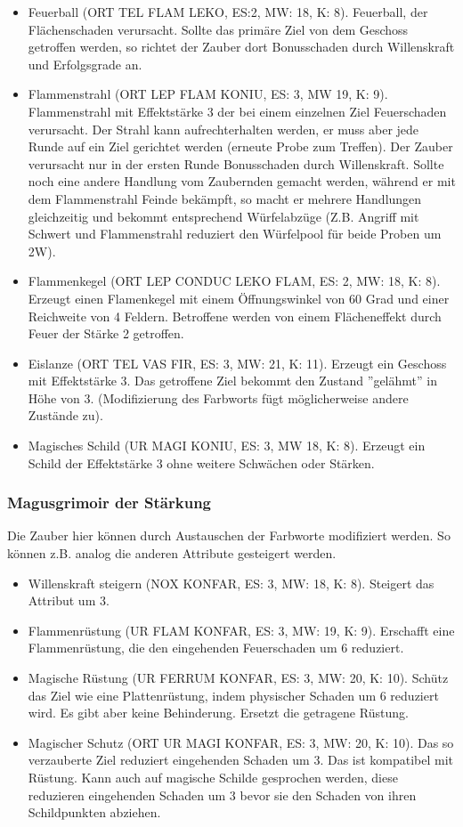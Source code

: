 \documentclass{article}
\begin{document}
\begin{itemize}
\item Feuerball (ORT TEL FLAM LEKO, ES:2, MW: 18, K: 8). Feuerball, der Flächenschaden verursacht. Sollte das primäre Ziel von dem Geschoss getroffen werden, so richtet der Zauber dort Bonusschaden durch Willenskraft und Erfolgsgrade an.
\item Flammenstrahl (ORT LEP FLAM KONIU, ES: 3, MW 19, K: 9). Flammenstrahl mit Effektstärke 3 der bei einem einzelnen Ziel Feuerschaden verursacht. Der Strahl kann aufrechterhalten werden, er muss aber jede Runde auf ein Ziel gerichtet werden (erneute Probe zum Treffen). Der Zauber verursacht nur in der ersten Runde Bonusschaden durch Willenskraft. Sollte noch eine andere Handlung vom Zaubernden gemacht werden, während er mit dem Flammenstrahl Feinde bekämpft, so macht er mehrere Handlungen gleichzeitig und bekommt entsprechend Würfelabzüge (Z.B. Angriff mit Schwert und Flammenstrahl reduziert den Würfelpool für beide Proben um 2W).
\item Flammenkegel (ORT LEP CONDUC LEKO FLAM, ES: 2, MW: 18, K: 8). Erzeugt einen Flamenkegel mit einem Öffnungswinkel von 60 Grad und einer Reichweite von 4 Feldern. Betroffene werden von einem Flächeneffekt durch Feuer der Stärke 2 getroffen.
\item Eislanze (ORT TEL VAS FIR, ES: 3, MW: 21, K: 11). Erzeugt ein Geschoss mit Effektstärke 3. Das getroffene Ziel bekommt den Zustand ''gelähmt'' in Höhe von 3. (Modifizierung des Farbworts fügt möglicherweise andere Zustände zu).
\item Magisches Schild (UR MAGI KONIU, ES: 3, MW 18, K: 8). Erzeugt ein Schild der Effektstärke 3 ohne weitere Schwächen oder Stärken.
\end{itemize}

\subsubsection{Magusgrimoir der Stärkung}

Die Zauber hier können durch Austauschen der Farbworte modifiziert werden. So können z.B. analog die anderen Attribute
gesteigert werden.

\begin{itemize}
\item Willenskraft steigern (NOX KONFAR, ES: 3, MW: 18, K: 8). Steigert das Attribut um 3.
\item Flammenrüstung (UR FLAM KONFAR, ES: 3, MW: 19, K: 9). Erschafft eine Flammenrüstung, die den eingehenden Feuerschaden um 6 reduziert.
\item Magische Rüstung (UR FERRUM KONFAR, ES: 3, MW: 20, K: 10). Schütz das Ziel wie eine Plattenrüstung, indem physischer Schaden um 6 reduziert wird. Es gibt aber keine Behinderung. Ersetzt die getragene Rüstung.
\item Magischer Schutz (ORT UR MAGI KONFAR, ES: 3, MW: 20, K: 10). Das so verzauberte Ziel reduziert eingehenden Schaden um 3. Das ist kompatibel mit Rüstung. Kann auch auf magische Schilde gesprochen werden, diese reduzieren eingehenden Schaden um 3 bevor sie den Schaden von ihren Schildpunkten abziehen.
\end{itemize}
\end{document}
